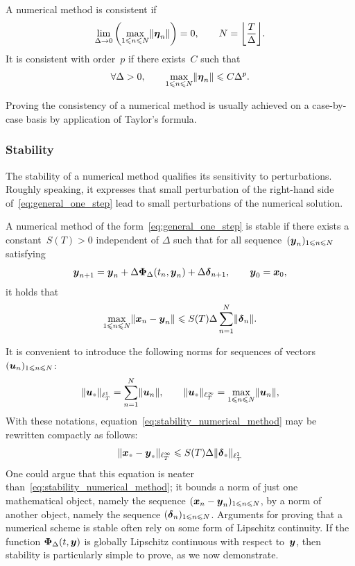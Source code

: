 \begin{definition}
    [Consistency]
    A numerical method is consistent if
    \[
        \lim_{\Delta \to 0} \left( \max_{1 \leq n \leq N} \vecnorm {\vect \eta_n} \right) = 0, \qquad N = \floor*{\frac{T}{\Delta}}.
    \]
    It is consistent with order~$p$ if there exists~$C$ such that
    \[
        \forall \Delta > 0, \qquad
         \max_{1 \leqslant n \leqslant N} \lVert\mathbf{\boldsymbol{\eta}}_n\rVert \leqslant C \Delta^p.
    \]
\end{definition}
Proving the consistency of a numerical method is usually achieved on a case-by-case basis by application of Taylor's formula.

\subsubsection*{Stability}%
\label{ssub:Stability}
The stability of a numerical method qualifies its sensitivity to perturbations.
Roughly speaking, it expresses that small perturbation of the right-hand side of~\eqref{eq:general_one_step} lead to small perturbations of the numerical solution.
\begin{definition}
    [Stability]
    A numerical method of the form~\eqref{eq:general_one_step} is stable if there exists a constant~$S(T) > 0$ independent of $\Delta$ such that for all sequence~$(\mathbf{\boldsymbol{y}}_n)_{1\leqslant n \leqslant N}$ satisfying
    \begin{equation}
        \label{eq:general_one_step_perturbed}
        \mathbf{\boldsymbol{y}}_{n+1} = \mathbf{\boldsymbol{y}}_n + \Delta \mathbf{\boldsymbol{\Phi}}_{\Delta}(t_n, \mathbf{\boldsymbol{y}}_n) + \Delta \mathbf{\boldsymbol{\delta}}_{n+1}, \qquad \mathbf{\boldsymbol{y}}_0 = \mathbf{\boldsymbol{x}}_0,
    \end{equation}
    it holds that
    \begin{equation}
        \label{eq:stability_numerical_method}
        \max_{1\leqslant n \leqslant N} \lVert \mathbf{\boldsymbol{x}}_n - \mathbf{\boldsymbol{y}}_n \rVert \leqslant S(T) \Delta \sum_{n=1}^{N} \lVert \mathbf{\boldsymbol{\delta}}_n \rVert.
    \end{equation}
\end{definition}
It is convenient to introduce the following norms for sequences of vectors $(\mathbf{\boldsymbol{u}}_{n})_{1 \leqslant n \leqslant N}$:
\[
    \norm{\vect u_{\placeholder}}_{\ell^1_T} = \sum_{n=1}^{N} \vecnorm{\vect u_{n}},
    \qquad
    \norm{\vect u_{\placeholder}}_{\ell^{\infty}_T} = \max_{1\leq n \leq N} \vecnorm{\vect u_{n}},
\]
With these notations, equation~\eqref{eq:stability_numerical_method} may be rewritten compactly as follows:
\[
    \norm{ \vect x_{\placeholder} - \vect y_{\placeholder} }_{\ell^{\infty}_T} \leq S(T) \Delta \norm{ \vect \delta_{\placeholder} }_{\ell^{1}_T}
\]
One could argue that this equation is neater than~\eqref{eq:stability_numerical_method};
it bounds a norm of just one mathematical object, namely the sequence $(\mathbf{\boldsymbol{x}}_n - \mathbf{\boldsymbol{y}}_n)_{1\leqslant n \leqslant N}$,
by a norm of another object, namely the sequence $(\mathbf{\boldsymbol{\delta}}_n)_{1\leqslant n \leqslant N}$.
Arguments for proving that a numerical scheme is stable often rely on some form of Lipschitz continuity.
If the function $\mathbf{\boldsymbol{\Phi}}_{\Delta}(t, \mathbf{\boldsymbol{y}})$ is globally Lipschitz continuous with respect to~$\mathbf{\boldsymbol{y}}$,
then stability is particularly simple to prove,
as we now demonstrate.

